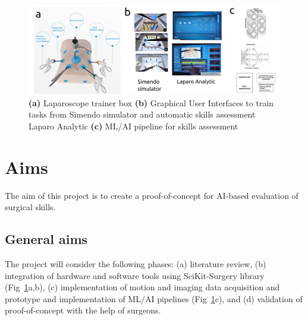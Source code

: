 \documentclass[11pt]{article}
\begin{document}
\begin{figure}[h]
\centering
\includegraphics[width=1.0\textwidth]{main/outputs/drawing-v00}
    \caption{
        \textbf{(a)} 
	Laparoscope trainer box 
	\textbf{(b)} 
	Graphical User Interfaces to train tasks from Simendo simulator and automatic skills assessment Laparo Analytic
	\textbf{(c)} 
	ML/AI pipeline for skills assessment \cite{alsonso-silverio2018}
       } 
\label{fig:main}
\end{figure}

\section{Aims}
The aim of this project is to create a proof-of-concept for AI-based evaluation of surgical skills.

\subsection{General aims}
The project will consider the following phases: 
(a) literature review,
(b) integration of hardware and software tools using SciKit-Surgery library (Fig~\ref{fig:main}a,b), 
(c) implementation of motion and imaging data acquisition and prototype and implementation of ML/AI pipelines (Fig~\ref{fig:main}c), and 
(d) validation of proof-of-concept with the help of surgeons.
\end{document}
